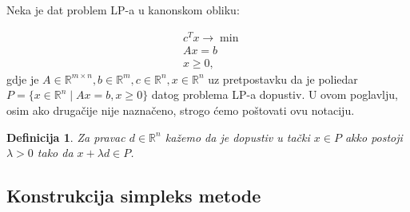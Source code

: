 \documentclass[a4paper, utf8, 11pt, colorlinks]{article}
\newtheorem{definition}{Definicija}
\begin{document}
Neka je dat problem LP-a u kanonskom obliku:

\begin{align}
    &c^Tx \rightarrow \min \nonumber \\ 
    & A x = b \nonumber \\
     & x \geq 0, \label{eq:lp_equality_constraint}
\end{align}
gdje je $A \in \mathbb{R}^{m \times n}, b \in \mathbb{R}^m, c \in \mathbb{R}^n, x\in \mathbb{R}^n$ uz pretpostavku da je poliedar $P=\{ x \in \mathbb{R}^n \mid A x = b , x \geq 0 \}$ datog problema LP-a dopustiv.  U ovom poglavlju, osim ako drugačije nije naznačeno, strogo ćemo poštovati ovu notaciju. 


\begin{definition}
      Za pravac $d\in \mathbb{R}^n$ kažemo da je dopustiv u tački $x \in P$ akko postoji $\lambda > 0$ tako da $x + \lambda d \in P$.
\end{definition}

\subsection{Konstrukcija simpleks metode}
\end{document}
